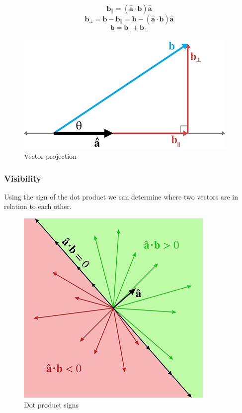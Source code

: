 \documentclass[11pt]{article}
\begin{document}
$$\textbf{b}_\|=(\hat{\textbf{a}}\cdot\textbf{b})\hat{\textbf{a}}$$
$$\textbf{b}_\perp=\textbf{b}-\textbf{b}_\|=\textbf{b}-(\hat{\textbf{a}}\cdot\textbf{b})\hat{\textbf{a}}$$
$$\textbf{b}=\textbf{b}_\|+\textbf{b}_\perp$$

\begin{figure}[H]
\centering
    \includegraphics{02_vector_projection}
\caption{Vector projection}
\label{fig:vector-projection}
\end{figure}

\subsubsection{Visibility}

Using the sign of the dot product we can determine where two vectors are in relation to each other.

\begin{figure}[H]
\centering
    \includegraphics{02_dot_signs}
\caption{Dot product signs}
\label{fig:dot-product-signs}
\end{figure}
\end{document}
